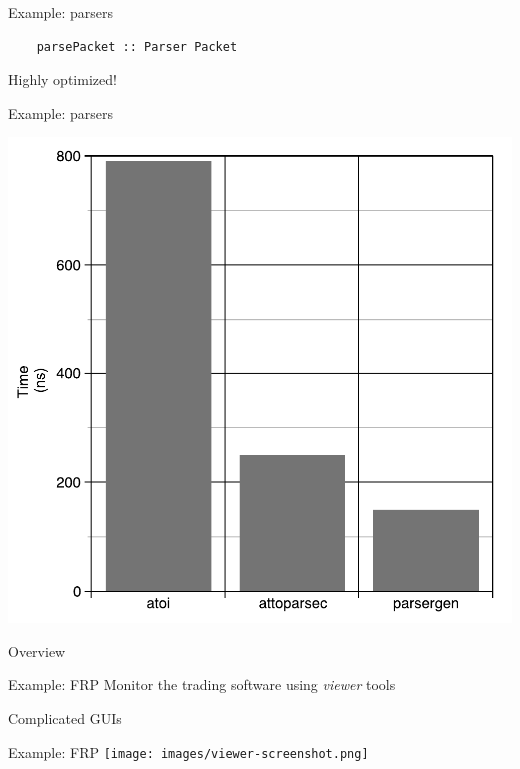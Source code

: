 \documentclass[20pt]{beamer}
\newcommand{\vspaced}{
    \vspace{5mm}
}
\begin{document}
\begin{frame}[fragile]{Example: parsers}
    \begin{lstlisting}
    parsePacket :: Parser Packet
    \end{lstlisting}
    \vspaced
    Highly optimized!
\end{frame}

\begin{frame}{Example: parsers}
    \begin{center}
    \includegraphics[height=0.8\textheight]{images/atoi.pdf}
    \end{center}
\end{frame}


\begin{frame}{Overview}
\end{frame}

\begin{frame}{Example: FRP}
    Monitor the trading software using \emph{viewer} tools \\
    \vspaced
    Complicated GUIs
\end{frame}

\begin{frame}{Example: FRP}
    \texttt{[image: images/viewer-screenshot.png]}
\end{frame}
\end{document}
